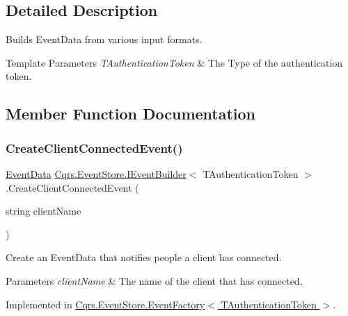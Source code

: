 \subsection{Detailed Description}
Builds Event\+Data from various input formats. 


\begin{DoxyTemplParams}{Template Parameters}
{\em T\+Authentication\+Token} & The Type of the authentication token.\\
\hline
\end{DoxyTemplParams}


\subsection{Member Function Documentation}
\mbox{\label{interfaceCqrs_1_1EventStore_1_1IEventBuilder_ae11ead7fa69632041e081e60f51c4e9f_ae11ead7fa69632041e081e60f51c4e9f}} 
\subsubsection{\texorpdfstring{Create\+Client\+Connected\+Event()}{CreateClientConnectedEvent()}}
{\footnotesize\ttfamily \hyperlink{classCqrs_1_1Events_1_1EventData}{Event\+Data} \hyperlink{interfaceCqrs_1_1EventStore_1_1IEventBuilder}{Cqrs.\+Event\+Store.\+I\+Event\+Builder}$<$ T\+Authentication\+Token $>$.Create\+Client\+Connected\+Event (\begin{DoxyParamCaption}\item[{string}]{client\+Name }\end{DoxyParamCaption})}



Create an Event\+Data that notifies people a client has connected. 


\begin{DoxyParams}{Parameters}
{\em client\+Name} & The name of the client that has connected.\\
\hline
\end{DoxyParams}


Implemented in \hyperlink{classCqrs_1_1EventStore_1_1EventFactory_a237daf998b545d170ab9f30187a0b8e7_a237daf998b545d170ab9f30187a0b8e7}{Cqrs.\+Event\+Store.\+Event\+Factory$<$ T\+Authentication\+Token $>$}.

